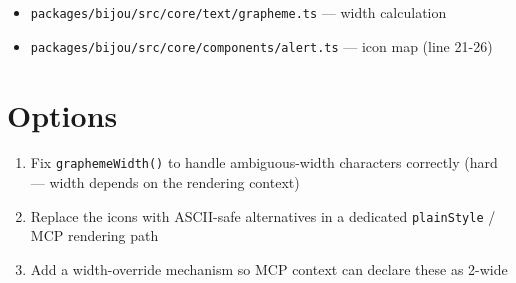 \begin{itemize}
\tightlist
\item
  \texttt{p\allowbreak{}a\allowbreak{}c\allowbreak{}k\allowbreak{}a\allowbreak{}g\allowbreak{}e\allowbreak{}s\allowbreak{}/\allowbreak{}b\allowbreak{}i\allowbreak{}j\allowbreak{}o\allowbreak{}u\allowbreak{}/\allowbreak{}s\allowbreak{}r\allowbreak{}c\allowbreak{}/\allowbreak{}c\allowbreak{}o\allowbreak{}r\allowbreak{}e\allowbreak{}/\allowbreak{}t\allowbreak{}e\allowbreak{}x\allowbreak{}t\allowbreak{}/\allowbreak{}g\allowbreak{}r\allowbreak{}a\allowbreak{}p\allowbreak{}h\allowbreak{}e\allowbreak{}m\allowbreak{}e\allowbreak{}.\allowbreak{}t\allowbreak{}s} --- width calculation
\item
  \texttt{p\allowbreak{}a\allowbreak{}c\allowbreak{}k\allowbreak{}a\allowbreak{}g\allowbreak{}e\allowbreak{}s\allowbreak{}/\allowbreak{}b\allowbreak{}i\allowbreak{}j\allowbreak{}o\allowbreak{}u\allowbreak{}/\allowbreak{}s\allowbreak{}r\allowbreak{}c\allowbreak{}/\allowbreak{}c\allowbreak{}o\allowbreak{}r\allowbreak{}e\allowbreak{}/\allowbreak{}c\allowbreak{}o\allowbreak{}m\allowbreak{}p\allowbreak{}o\allowbreak{}n\allowbreak{}e\allowbreak{}n\allowbreak{}t\allowbreak{}s\allowbreak{}/\allowbreak{}a\allowbreak{}l\allowbreak{}e\allowbreak{}r\allowbreak{}t\allowbreak{}.\allowbreak{}t\allowbreak{}s} --- icon map (line 21-26)
\end{itemize}

\section{Options}\label{record-402-options}

\begin{enumerate}
\def\labelenumi{\arabic{enumi}.}
\tightlist
\item
  Fix \texttt{g\allowbreak{}r\allowbreak{}a\allowbreak{}p\allowbreak{}h\allowbreak{}e\allowbreak{}m\allowbreak{}e\allowbreak{}W\allowbreak{}i\allowbreak{}d\allowbreak{}t\allowbreak{}h\allowbreak{}(\allowbreak{})} to handle ambiguous-width characters correctly (hard --- width depends on the rendering context)
\item
  Replace the icons with ASCII-safe alternatives in a dedicated \texttt{p\allowbreak{}l\allowbreak{}a\allowbreak{}i\allowbreak{}n\allowbreak{}S\allowbreak{}t\allowbreak{}y\allowbreak{}l\allowbreak{}e} / MCP rendering path
\item
  Add a width-override mechanism so MCP context can declare these as 2-wide
\end{enumerate}

